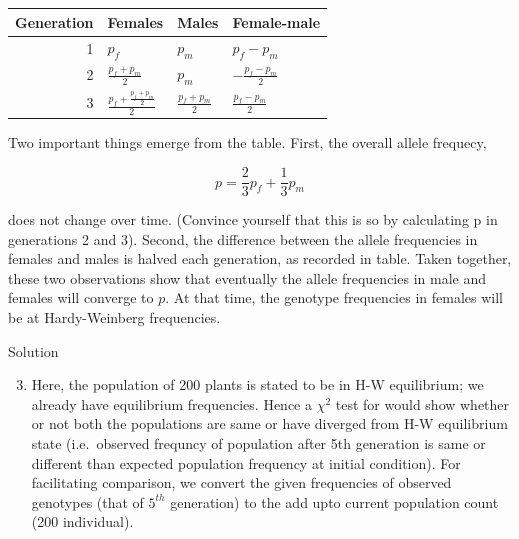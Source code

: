 \documentclass[11pt,dvipsnames,ignorenonframetext,aspectratio=169]{beamer}
\providecommand{\tightlist}{%
  \setlength{\itemsep}{0pt}\setlength{\parskip}{0pt}}
\begin{document}
\begin{frame}{}
\protect\hypertarget{section-19}{}
\begin{table}
\centering\begingroup\fontsize{6}{8}\selectfont

\begin{tabular}{rlll}
\toprule
Generation & Females & Males & Female-male\\
\midrule
1 & $p_f$ & $p_m$ & $p_f - p_m$\\
2 & $\frac{p_f + p_m}{2}$ & $p_m$ & $-\frac{p_f -p_m}{2}$\\
3 & $\frac{p_f + \frac{p_f + p_m}{2}}{2}$ & $\frac{p_f+ p_m}{2}$ & $\frac{p_f -p_m}{2}$\\
\bottomrule
\end{tabular}
\endgroup{}
\end{table}

Two important things emerge from the table. First, the overall allele
frequecy,

\[
p = \frac{2}{3}p_f + \frac{1}{3}p_m
\]

does not change over time. (Convince yourself that this is so by
calculating p in generations 2 and 3). Second, the difference between
the allele frequencies in females and males is halved each generation,
as recorded in table. Taken together, these two observations show that
eventually the allele frequencies in male and females will converge to
\(p\). At that time, the genotype frequencies in females will be at
Hardy-Weinberg frequencies.
\end{frame}

\begin{frame}{Solution}
\protect\hypertarget{solution-1}{}
\begin{enumerate}
\setcounter{enumi}{2}
\tightlist
\item
  Here, the population of 200 plants is stated to be in H-W equilibrium;
  we already have equilibrium frequencies. Hence a \(\chi^2\) test for
  would show whether or not both the populations are same or have
  diverged from H-W equilibrium state (i.e.~observed frequncy of
  population after 5th generation is same or different than expected
  population frequency at initial condition). For facilitating
  comparison, we convert the given frequencies of observed genotypes
  (that of \(5^{th}\) generation) to the add upto current population
  count (200 individual).
\end{enumerate}
\end{frame}
\end{document}
